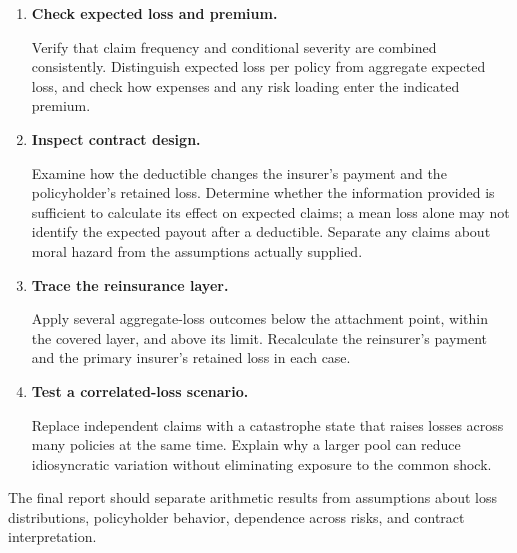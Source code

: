 \begin{enumerate}

\item \textbf{Check expected loss and premium.}

Verify that claim frequency and conditional severity are combined consistently. Distinguish expected loss per policy from aggregate expected loss, and check how expenses and any risk loading enter the indicated premium.

\item \textbf{Inspect contract design.}

Examine how the deductible changes the insurer's payment and the policyholder's retained loss. Determine whether the information provided is sufficient to calculate its effect on expected claims; a mean loss alone may not identify the expected payout after a deductible. Separate any claims about moral hazard from the assumptions actually supplied.

\item \textbf{Trace the reinsurance layer.}

Apply several aggregate-loss outcomes below the attachment point, within the covered layer, and above its limit. Recalculate the reinsurer's payment and the primary insurer's retained loss in each case.

\item \textbf{Test a correlated-loss scenario.}

Replace independent claims with a catastrophe state that raises losses across many policies at the same time. Explain why a larger pool can reduce idiosyncratic variation without eliminating exposure to the common shock.

\end{enumerate}

The final report should separate arithmetic results from assumptions about loss distributions, policyholder behavior, dependence across risks, and contract interpretation.




